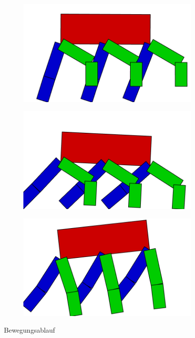 \begin{figure}[H]
        \begin{subfigure}[b]{0.3\textwidth}
          \includegraphics[width=\linewidth,center]{graphics/movement/45}
          \caption{\label{fig:ConceptMovement45}}
        \end{subfigure}
        \hspace{\fill}
        \begin{subfigure}[b]{0.3\textwidth}
          \includegraphics[width=\linewidth,center]{graphics/movement/50}
          \caption{\label{fig:ConceptMovement50}}
        \end{subfigure}
        \hspace{\fill}
        \begin{subfigure}[b]{0.3\textwidth}
          \includegraphics[width=\linewidth,center]{graphics/movement/55}
          \caption{\label{fig:ConceptMovement55}}
        \end{subfigure}

        \caption{Bewegungsablauf\label{fig:ConceptMovementPhase12}}
      \end{figure}

